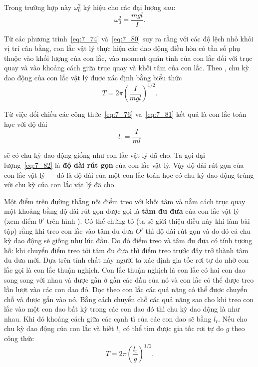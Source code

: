 \noindent
Trong trường hợp này $\omega_0^2$ ký hiệu cho các đại lượng sau:
\begin{equation}\label{eq:7_80}
	\omega_0^2 = \frac{mgl}{I}.
\end{equation}

Từ các phương trình~\eqref{eq:7_74} và~\eqref{eq:7_80} suy ra rằng với các độ lệch nhỏ khỏi vị trí cân bằng, con lắc vật lý thực hiện các dao động điều hòa có tần số phụ thuộc vào khối lượng của con lắc, vào moment quán tính của con lắc đối với trục quay và vào khoảng cách giữa trục quay và khối tâm của con lắc. Theo , chu kỳ dao động của con lắc vật lý được xác định bằng biểu thức
\begin{equation}\label{eq:7_81}
	T = 2\pi\left(\frac{I}{mgl}\right)^{1/2}.
\end{equation}

\noindent
Từ việc đối chiếu các công thức~\eqref{eq:7_76} va~\eqref{eq:7_81} kết quả là con lắc toán học với độ dài
\begin{equation}\label{eq:7_82}
	l_{\text{r}} = \frac{I}{ml}
\end{equation}

\noindent
sẽ có chu kỳ dao động giống như con lắc vật lý đã cho. Ta gọi đại lượng~\eqref{eq:7_82} là \textbf{độ dài rút gọn} của con lắc vật lý. Vậy độ dài rút gọn của con lắc vật lý --- đó là độ dài của một con lắc toán học có chu kỳ dao động trùng với chu kỳ của con lắc vật lý đã cho.

Một điểm trên đường thẳng nối điểm treo với khối tâm và nằm cách trục quay một khoảng bằng độ dài rút gọn được gọi là \textbf{tâm đu đưa} của con lắc vật lý (xem điểm $0'$ trên hình ). Có thể chứng tỏ (ta sẽ giới thiệu điều này khi làm bài tập) rằng khi treo con lắc vào tâm đu đưa $O'$ thì độ dài rút gọn và do đó cả chu kỳ dao động sẽ giống như lúc đầu. Do đó điểm treo và tâm đu đưa có tính tương hỗ: khi chuyển điểm treo tới tâm đu đưa thì điểm treo trước đây trở thành tâm đu đưa mới. Dựa trên tính chất này người ta xác định gia tốc rơi tự do nhờ con lắc gọi là con lắc thuận nghịch. Con lắc thuận nghịch là con lắc có hai con dao song song với nhau và được gắn ở gần các đầu của nó và con lắc có thể được treo lần lượt vào các con dao đó. Dọc theo con lắc các quả nặng có thể được chuyển chỗ và được gắn vào nó. Bằng cách chuyển chỗ các quả nặng sao cho khi treo con lắc vào một con dao bất kỳ trong các con dao đó thì chu kỳ dao động là như nhau. Khi đó khoảng cách giữa các cạnh tì của các con dao sẽ bằng $l_{\text{r}}$. Nếu cho chu kỳ dao động của con lắc và biết $l_{\text{r}}$ có thể tìm được gia tốc rơi tự do $g$ theo công thức
\begin{equation*}
	T = 2\pi\left(\frac{l_{\text{r}}}{g}\right)^{1/2}.
\end{equation*}

